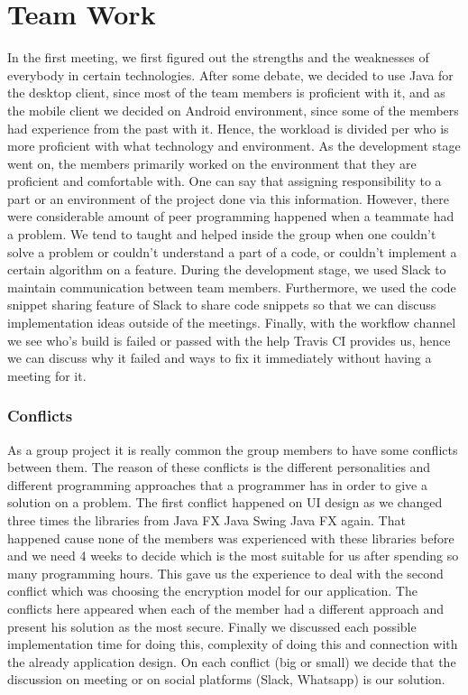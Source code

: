 \documentclass[11pt,a4paper]{report}
\begin{document}
\chapter{Team Work}
In the first meeting, we first figured out the strengths and the weaknesses of everybody in certain technologies. After some debate, we decided to use Java for the desktop client, since most of the team members is proficient with it, and as the mobile client we decided on Android environment, since some of the members had experience from the past with it. Hence, the workload is divided per who is more proficient with what technology and environment.
As the development stage went on, the members primarily worked on the environment that they are proficient and comfortable with. One can say that assigning responsibility to a part or an environment of the project done via this information. However, there were considerable amount of peer programming happened when a teammate had a problem. We tend to taught and helped inside the group when one couldn’t solve a problem or couldn’t understand a part of a code, or couldn’t implement a certain algorithm on a feature.
During the development stage, we used Slack to maintain communication between team members. Furthermore, we used the code snippet sharing feature of Slack to share code snippets so that we can discuss implementation ideas outside of the meetings. Finally, with the workflow channel we see who’s build is failed or passed with the help Travis CI provides us, hence we can discuss why it failed and ways to fix it immediately without having a meeting for it.

\subsection{Conflicts}
As a group project it is really common the group members to have some conflicts between them. The reason of these conflicts is the different personalities and different programming approaches that a programmer has in order to give a solution on a problem. The first conflict happened on UI design as we changed three times the libraries from Java FX \textrightarrow{} Java Swing \textrightarrow{} Java FX again. That happened cause none of the members was experienced with these libraries before and we need 4 weeks to decide which is the most suitable for us after spending so many programming hours. This gave us the experience to deal with the second conflict which was choosing the encryption model for our application. The conflicts here appeared when each of the member had a different approach and present his solution as the most secure. Finally we discussed each possible implementation time for doing this, complexity of doing this and connection with the already application design. On each conflict (big or small) we decide that the discussion on meeting or on social platforms (Slack, Whatsapp) is our solution.
\end{document}
